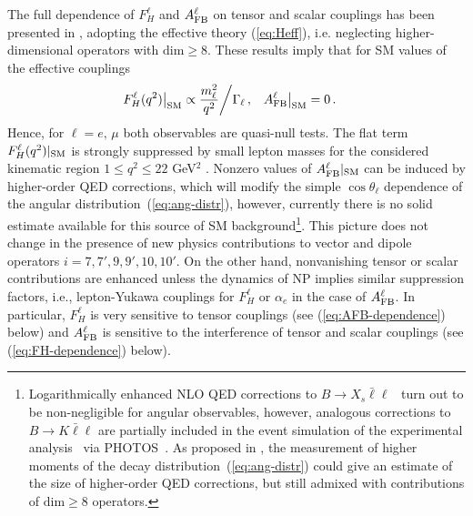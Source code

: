 \documentclass[twocolumn,epjc3]{svjour3}
\numberwithin{equation}{section}
\def \refeq#1{(\ref{#1})}
\renewcommand{\[}{\big[}
\renewcommand{\]}{\big]}
\renewcommand{\(}{\big(}
\renewcommand{\)}{\big)}
\begin{document}
The full dependence of $F_H^\ell$ and $A_{\rm FB}^\ell$ on tensor and
scalar couplings has been presented in \cite{Bobeth:2007dw,
  Bobeth:2012vn}, adopting the effective theory \refeq{eq:Heff},
i.e. neglecting higher-dimensional operators with {$\mbox{dim} \geq
  8$}. These results imply that for SM values of the effective
couplings
\begin{align}
  F_H^\ell(q^2) \big|_{\rm SM} & \propto \frac{m_\ell^2}{q^2}
    {\bigg/ \Gamma_\ell} \,, &
  A_{\rm FB}^\ell \big|_{\rm SM} & = 0 \,.
\end{align}
Hence, for $\ell = e,\, \mu$ both observables are quasi-null tests.
The flat term $F_H^\ell(q^2)|_{\rm SM}$ is strongly suppressed {by
  small lepton masses for the considered kinematic region $1 \leq
  q^2 \leq 22$ GeV$^2$} \cite{Bobeth:2007dw, Bobeth:2011nj,
  Bouchard:2013eph}.  Nonzero values of $A_{\rm FB}^\ell|_{\rm SM}$
can be induced by higher-order QED corrections, which will modify the
simple $\cos\theta_\ell$ dependence of the angular
distribution~\refeq{eq:ang-distr}, however, currently there is no
solid estimate available for this source of SM background\footnote{
  Logarithmically enhanced NLO QED corrections to $B\to X_s
  \bar\ell\ell$~\cite{Huber:2015sra} turn out to be non-negligible
  for angular observables,
  however, analogous corrections to $B\to K \bar\ell\ell$ are partially
  included in the event simulation of the experimental
  analysis~\cite{Aaij:2014tfa} via PHOTOS~\cite{Golonka:2005pn}.
  As proposed in \cite{Gratrex:2015hna}, the measurement of higher
  moments of the decay distribution~\refeq{eq:ang-distr} could give an
  estimate of the size of higher-order QED corrections, but still
  admixed with contributions of $\mbox{dim} \geq 8$ operators.}.
This picture does not change in the presence of new physics contributions to
vector and dipole operators $i = 7,7',9,9',10,10'$. On the other hand,
nonvanishing tensor or scalar contributions are enhanced unless the dynamics of
NP implies similar suppression factors, i.e., lepton-Yukawa couplings for
$F_H^\ell$ or $\alpha_e$ in the case of $A_{\rm FB}^\ell$. In particular,
$F_H^\ell$ is very sensitive to tensor couplings (see \refeq{eq:AFB-dependence}
below) and $A_{\rm FB}^\ell$ is sensitive to the interference of tensor and
scalar couplings (see \refeq{eq:FH-dependence} below).
\end{document}
